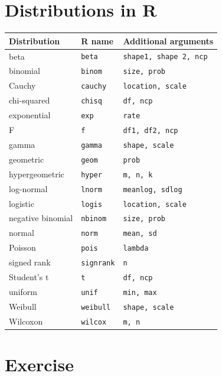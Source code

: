\documentclass[
]{book}
\begin{document}
\hypertarget{distributions-in-r}{%
\section{Distributions in R}\label{distributions-in-r}}

\begin{longtable}[]{@{}lll@{}}
\toprule\noalign{}
Distribution & R name & Additional arguments \\
\midrule\noalign{}
\endhead
\bottomrule\noalign{}
\endlastfoot
beta & \texttt{beta} & \texttt{shape1,\ shape\ 2,\ ncp} \\
binomial & \texttt{binom} & \texttt{size,\ prob} \\
Cauchy & \texttt{cauchy} & \texttt{location,\ scale} \\
chi-squared & \texttt{chisq} & \texttt{df,\ ncp} \\
exponential & \texttt{exp} & \texttt{rate} \\
F & \texttt{f} & \texttt{df1,\ df2,\ ncp} \\
gamma & \texttt{gamma} & \texttt{shape,\ scale} \\
geometric & \texttt{geom} & \texttt{prob} \\
hypergeometric & \texttt{hyper} & \texttt{m,\ n,\ k} \\
log-normal & \texttt{lnorm} & \texttt{meanlog,\ sdlog} \\
logistic & \texttt{logis} & \texttt{location,\ scale} \\
negative binomial & \texttt{nbinom} & \texttt{size,\ prob} \\
normal & \texttt{norm} & \texttt{mean,\ sd} \\
Poisson & \texttt{pois} & \texttt{lambda} \\
signed rank & \texttt{signrank} & \texttt{n} \\
Student's t & \texttt{t} & \texttt{df,\ ncp} \\
uniform & \texttt{unif} & \texttt{min,\ max} \\
Weibull & \texttt{weibull} & \texttt{shape,\ scale} \\
Wilcoxon & \texttt{wilcox} & \texttt{m,\ n} \\
\end{longtable}

\hypertarget{exercise}{%
\section{Exercise}\label{exercise}}
\end{document}
